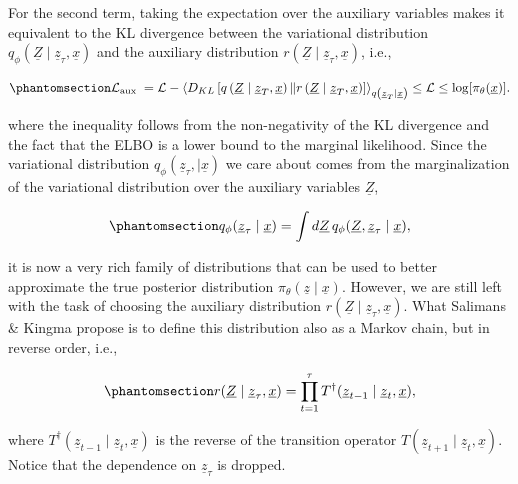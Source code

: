 \documentclass[
]{scrartcl}
\begin{document}
\begin{refsection}
For the second term, taking the expectation over the auxiliary variables
makes it equivalent to the KL divergence between the variational
distribution
\(q_\phi(\underline{Z} \mid \underline{z}_\tau, \underline{x})\) and the
auxiliary distribution
\(r(\underline{Z} \mid \underline{z}_\tau, \underline{x})\), i.e.,

\begin{equation}\phantomsection\label{eq-elbo-aux-5}{
\mathcal{L}_{\text {aux }} = \mathcal{L} - 
\left\langle 
    D_{K L}\left[
        q\left(\underline{Z} \mid \underline{z}_T, \underline{x}\right) \| 
        r\left(\underline{Z} \mid \underline{z}_T, \underline{x}\right)
    \right]
\right\rangle_{q\left(\underline{z}_T \mid \underline{x}\right)}
\leq \mathcal{L} \leq \log [\pi_\theta(\underline{x})].
}\end{equation}

where the inequality follows from the non-negativity of the KL
divergence and the fact that the ELBO is a lower bound to the marginal
likelihood. Since the variational distribution
\(q_\phi(\underline{z}_\tau,\mid \underline{x})\) we care about comes
from the marginalization of the variational distribution over the
auxiliary variables \(\underline{Z}\),

\begin{equation}\phantomsection\label{eq-mcmc-marginalization}{
q_\phi(\underline{z}_\tau \mid \underline{x}) = 
\int d\underline{Z} \, 
q_\phi(\underline{Z}, \underline{z}_\tau \mid \underline{x}),
}\end{equation}

it is now a very rich family of distributions that can be used to better
approximate the true posterior distribution
\(π_\theta(\underline{z} \mid
\underline{x})\). However, we are still left with the task of choosing
the auxiliary distribution \(r(\underline{Z} \mid \underline{z}_\tau,
\underline{x})\). What Salimans \& Kingma \autocite{salimans2015}
propose is to define this distribution also as a Markov chain, but in
reverse order, i.e.,

\begin{equation}\phantomsection\label{eq-mcmc-chain-def-aux}{
r(\underline{Z} \mid \underline{z}_\tau, \underline{x}) = 
\prod_{t=1}^\tau 
T^\dagger(\underline{z}_{t-1} \mid \underline{z}_t, \underline{x}),
}\end{equation}

where
\(T^\dagger(\underline{z}_{t-1} \mid \underline{z}_t, \underline{x})\)
is the reverse of the transition operator \(T(\underline{z}_{t+1} \mid
\underline{z}_t, \underline{x})\). Notice that the dependence on
\(\underline{z}_\tau\) is dropped.


\end{refsection}
\end{document}

